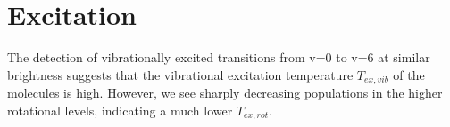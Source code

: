 \documentclass[12pt]{article}
\begin{document}
















\section{Excitation}
The detection of vibrationally excited transitions from v=0 to v=6 at similar
brightness suggests that the vibrational excitation temperature $T_{ex,vib}$ of
the molecules is high.  However, we see sharply decreasing populations in
the higher rotational levels, indicating a much lower $T_{ex,rot}$.



\end{document}
